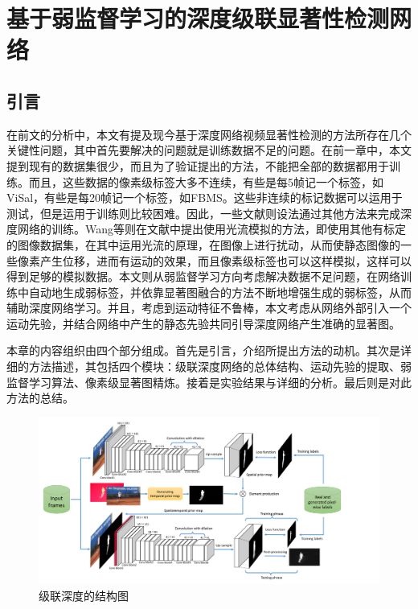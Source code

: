 \chapter{基于弱监督学习的深度级联显著性检测网络}
\renewcommand{\leftmark}{第二章\quad 基于弱监督学习的深度级联显著性检测网络}
\renewcommand{\figurename}{图}

\section{引言}
在前文的分析中，本文有提及现今基于深度网络视频显著性检测的方法所存在几个关键性问题，其中首先要解决的问题就是训练数据不足的问题。在前一章中，本文提到现有的数据集很少，而且为了验证提出的方法，不能把全部的数据都用于训练。而且，这些数据的像素级标签大多不连续，有些是每5帧记一个标签，如ViSal\cite{ViSalWang}，有些是每20帧记一个标签，如FBMS\cite{ochs2013segmentation}。这些非连续的标记数据可以运用于测试，但是运用于训练则比较困难。因此，一些文献则设法通过其他方法来完成深度网络的训练。Wang等则在文献\cite{8047320}中提出使用光流模拟的方法，即使用其他有标定的图像数据集，在其中运用光流的原理，在图像上进行扰动，从而使静态图像的一些像素产生位移，进而有运动的效果，而且像素级标签也可以这样模拟，这样可以得到足够的模拟数据。本文则从弱监督学习方向考虑解决数据不足问题，在网络训练中自动地生成弱标签，并依靠显著图融合的方法不断地增强生成的弱标签，从而辅助深度网络学习。并且，考虑到运动特征不鲁棒，本文考虑从网络外部引入一个运动先验，并结合网络中产生的静态先验共同引导深度网络产生准确的显著图。

本章的内容组织由四个部分组成。首先是引言，介绍所提出方法的动机。其次是详细的方法描述，其包括四个模块：级联深度网络的总体结构、运动先验的提取、弱监督学习算法、像素级显著图精炼。接着是实验结果与详细的分析。最后则是对此方法的总结。

\begin{figure}
\includegraphics[width=15cm]{figures/scnn_framework}
\caption{级联深度的结构图}
\label{figure2}
\end{figure}

